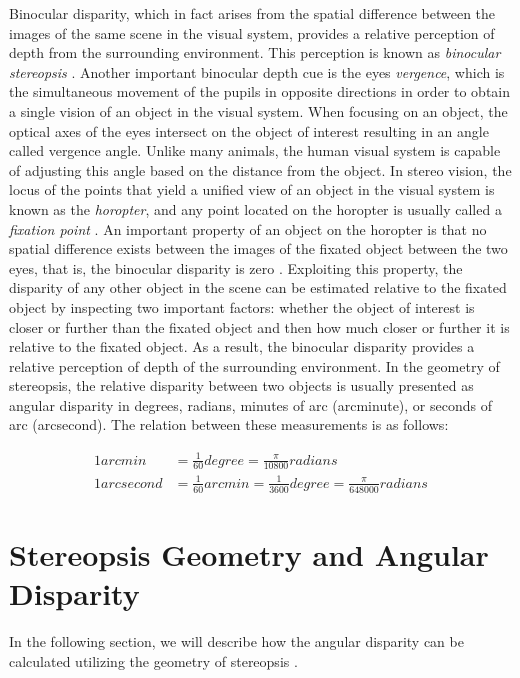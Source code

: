 Binocular disparity, which in fact arises from the spatial difference 
between the images of the same scene in the visual system, provides a relative perception of depth 
from the surrounding environment. This perception is known as {\it binocular stereopsis} \cite{how95}. 
Another important binocular depth cue is the eyes {\it vergence}, which is the simultaneous movement of the pupils in opposite directions in order to obtain a single vision of an object in the visual system. 
When focusing on an object, the optical axes of the eyes intersect on the object of interest resulting in an angle called vergence angle. Unlike many animals, the human visual system 
is capable of adjusting this angle based on the distance from the object.
In stereo vision, the locus of the points that yield a unified view of an object in the visual system is 
known as the {\it horopter}, and any point located on the horopter is usually called a 
{\it fixation point} \cite{binr83,how95}.
An important property of an object on the horopter is that no spatial difference
exists between the images of the fixated object between the two eyes, that is, the binocular disparity is zero \cite{how95}. 
Exploiting this property, the disparity of any other object in the scene can be estimated relative to the fixated object by inspecting two important factors: 
whether the object of interest is closer or further than the fixated object and then how much closer or further it is relative to the fixated object.
As a result, the binocular disparity provides a relative perception of depth of the surrounding environment.
In the geometry of stereopsis, the relative disparity between two objects is usually presented as 
angular disparity in degrees, radians, minutes of arc (arcminute), 
or seconds of arc (arcsecond). The relation between these measurements is as follows:

\begin{align}
1 arcmin &= \frac{1}{60} degree = \frac{\pi}{10800} radians \label{eq:arcmin} \\
1 arcsecond &= \frac{1}{60} arcmin = \frac{1}{3600} degree = \frac{\pi}{648000} radians \label{eq:arcsec}
\end{align}

\section{Stereopsis Geometry and Angular Disparity}

In the following section, we will describe how the angular disparity can be calculated utilizing the geometry of stereopsis \cite{binr83}.

